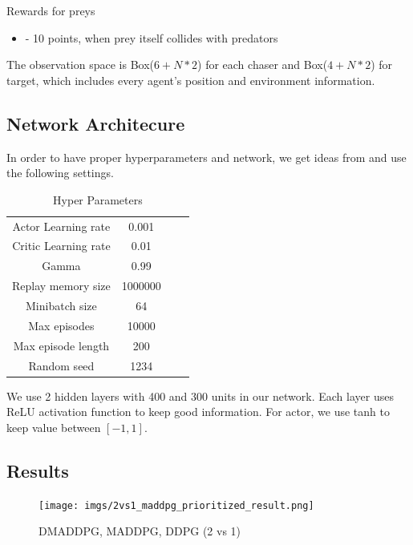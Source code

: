 \documentclass[11pt,twocolumn]{jarticle} %
\begin{document}
Rewards for preys
\begin{itemize}
  \item - 10 points, when prey itself collides with predators
\end{itemize}

The observation space is Box($6+N*2$) for each chaser and Box($4+N*2$) for target, which includes every agent's position and environment information.



\subsection{Network Architecure}
In order to have proper hyperparameters and network, we get ideas from \cite{param} and use the following settings.

\begin{table}[ht]
 \caption{Hyper Parameters} 
 \label{tbl:hyperparameters}
  \begin{center}
    \begin{tabular}{c|ccc}
  \hline \hline
  Actor Learning rate  & 0.001   \\
  Critic Learning rate & 0.01    \\
  Gamma                & 0.99    \\
  Replay memory size   & 1000000 \\
  Minibatch size       & 64      \\
  Max episodes         & 10000   \\
  Max episode length   & 200     \\
  Random seed          & 1234    \\\hline
    \end{tabular}
  \end{center}
\end{table}

We use 2 hidden layers with 400 and 300 units in our network.
Each layer uses ReLU activation function to keep good information.
For actor, we use tanh to keep value between $[-1, 1]$. 

\subsection{Results}

\begin{figure}[ht]
 \begin{center}
  \texttt{[image: imgs/2vs1\_maddpg\_prioritized\_result.png]}
  \caption{DMADDPG, MADDPG, DDPG (2 vs 1)}
  \label{fig:result1}
 \end{center}
\end{figure}
\end{document}
